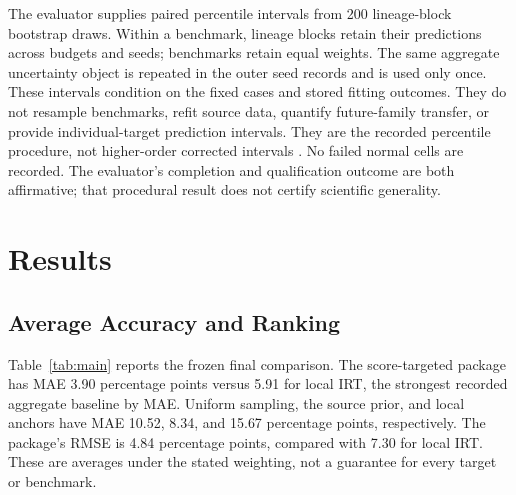 \documentclass{article}
\begin{document}
The evaluator supplies paired percentile intervals from 200 lineage-block bootstrap draws. Within a benchmark, lineage blocks retain their predictions across budgets and seeds; benchmarks retain equal weights. The same aggregate uncertainty object is repeated in the outer seed records and is used only once. These intervals condition on the fixed cases and stored fitting outcomes. They do not resample benchmarks, refit source data, quantify future-family transfer, or provide individual-target prediction intervals. They are the recorded percentile procedure, not higher-order corrected intervals \citep{Efron1987}. No failed normal cells are recorded. The evaluator's completion and qualification outcome are both affirmative; that procedural result does not certify scientific generality.

\section{Results}
\subsection{Average Accuracy and Ranking}
Table~\ref{tab:main} reports the frozen final comparison. The score-targeted package has MAE 3.90 percentage points versus 5.91 for local IRT, the strongest recorded aggregate baseline by MAE. Uniform sampling, the source prior, and local anchors have MAE 10.52, 8.34, and 15.67 percentage points, respectively. The package's RMSE is 4.84 percentage points, compared with 7.30 for local IRT. These are averages under the stated weighting, not a guarantee for every target or benchmark.

\begin{table}[t]
\centering
\caption{Equal-cell averages over the retained final cases. Error units are percentage points (pp); rank correlations use lineage means. Only the source prior uses no target answers. Baseline RMSE and correlations are reconstructed from the recorded prediction arrays; a constant prior cannot provide a meaningful ranking, so its correlations are omitted.}
\label{tab:main}

\end{table}
\end{document}
